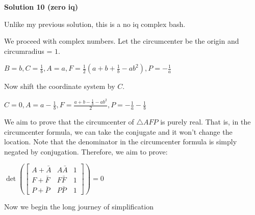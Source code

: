 \begin{enumerate}
 



\textbf{Solution 10 (zero iq)}

Unlike my previous solution, this is a no iq complex bash.

 We proceed with complex numbers. Let the circumcenter be the origin and circumradius = $1$.

 $B=b, C=\frac{1}{b}, A = a, F = \frac{1}{2}(a+b+\frac{1}{b}-ab^2), P = -\frac{1}{a}$

 Now shift the coordinate system by $C$.

 $C=0, A=a-\frac{1}{b}, F = \frac{a+b-\frac{1}{b}-ab^2}{2}, P=-\frac{1}{a}-\frac{1}{b}$

 We aim to prove that the circumcenter of $\triangle AFP$ is purely real. That is, in the circumcenter formula, we can take the conjugate and it won't change the location. Note that the denominator in the circumcenter formula is simply negated by conjugation. Therefore, we aim to prove:

 
$\det(\begin{bmatrix} A+\bar{A}& A\bar{A} & 1\\ F+\bar{F}& F\bar{F} & 1\\ P+\bar{P}&P\bar{P}&1 \end{bmatrix})=0$

 
Now we begin the long journey of simplification


\end{enumerate}

